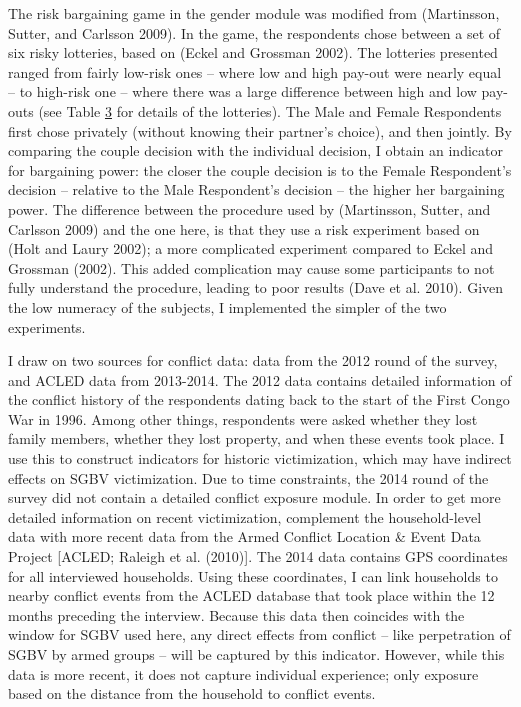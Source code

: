 \documentclass[
]{article}
\begin{document}
The risk bargaining game in the gender module was modified from
(Martinsson, Sutter, and Carlsson 2009). In the game, the respondents
chose between a set of six risky lotteries, based on (Eckel and Grossman
2002). The lotteries presented ranged from fairly low-risk ones -- where
low and high pay-out were nearly equal -- to high-risk one -- where
there was a large difference between high and low pay-outs (see Table
\hyperref[tab:bargaining]{3} for details of the lotteries). The Male and
Female Respondents first chose privately (without knowing their
partner's choice), and then jointly. By comparing the couple decision
with the individual decision, I obtain an indicator for bargaining
power: the closer the couple decision is to the Female Respondent's
decision -- relative to the Male Respondent's decision -- the higher her
bargaining power. The difference between the procedure used by
(Martinsson, Sutter, and Carlsson 2009) and the one here, is that they
use a risk experiment based on (Holt and Laury 2002); a more complicated
experiment compared to Eckel and Grossman (2002). This added
complication may cause some participants to not fully understand the
procedure, leading to poor results (Dave et al. 2010). Given the low
numeracy of the subjects, I implemented the simpler of the two
experiments.

I draw on two sources for conflict data: data from the 2012 round of the
survey, and ACLED data from 2013-2014. The 2012 data contains detailed
information of the conflict history of the respondents dating back to
the start of the First Congo War in 1996. Among other things,
respondents were asked whether they lost family members, whether they
lost property, and when these events took place. I use this to construct
indicators for historic victimization, which may have indirect effects
on SGBV victimization. Due to time constraints, the 2014 round of the
survey did not contain a detailed conflict exposure module. In order to
get more detailed information on recent victimization, complement the
household-level data with more recent data from the Armed Conflict
Location \& Event Data Project {[}ACLED; Raleigh et al. (2010){]}. The
2014 data contains GPS coordinates for all interviewed households. Using
these coordinates, I can link households to nearby conflict events from
the ACLED database that took place within the 12 months preceding the
interview. Because this data then coincides with the window for SGBV
used here, any direct effects from conflict -- like perpetration of SGBV
by armed groups -- will be captured by this indicator. However, while
this data is more recent, it does not capture individual experience;
only exposure based on the distance from the household to conflict
events.
\end{document}
